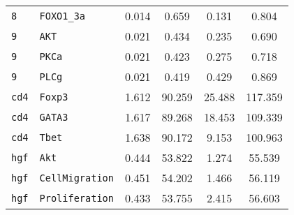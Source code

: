 \begin{longtable}{llcccc}
\texttt{8} & \texttt{FOXO1\_3a} & 0.014 & 0.659 & 0.131 & 0.804 \\
\texttt{9} & \texttt{AKT} & 0.021 & 0.434 & 0.235 & 0.690 \\
\texttt{9} & \texttt{PKCa} & 0.021 & 0.423 & 0.275 & 0.718 \\
\texttt{9} & \texttt{PLCg} & 0.021 & 0.419 & 0.429 & 0.869 \\
\texttt{cd4} & \texttt{Foxp3} & 1.612 & 90.259 & 25.488 & 117.359 \\
\texttt{cd4} & \texttt{GATA3} & 1.617 & 89.268 & 18.453 & 109.339 \\
\texttt{cd4} & \texttt{Tbet} & 1.638 & 90.172 & 9.153 & 100.963 \\
\texttt{hgf} & \texttt{Akt} & 0.444 & 53.822 & 1.274 & 55.539 \\
\texttt{hgf} & \texttt{CellMigration} & 0.451 & 54.202 & 1.466 & 56.119 \\
\texttt{hgf} & \texttt{Proliferation} & 0.433 & 53.755 & 2.415 & 56.603 \\
\end{longtable}
\endgroup
\clearpage
